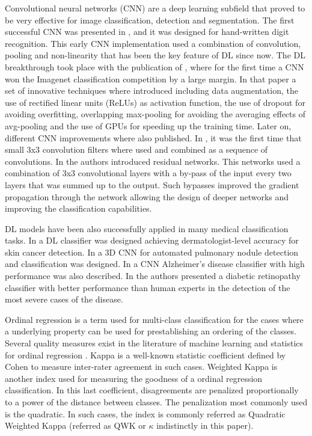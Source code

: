\documentclass[preprint]{elsarticle}
\theoremstyle{definition} %
\theoremstyle{remark}
\begin{document}
Convolutional neural networks (CNN) are a deep learning subfield that proved to be very effective for image classification, detection and segmentation. The first successful CNN was presented in \citep{LeCun:98}, and it was designed for hand-written digit recognition. This early CNN implementation used a combination of convolution, pooling and non-linearity that has been the key feature of DL since now. The DL breakthrough took place with the publication of \citep{NIPS2012_4824}, where for the first time a CNN won the Imagenet\citep{imagenet_cvpr09} classification competition by a large margin. In that paper a set of innovative techniques where introduced including data augmentation, the use of rectified linear units (ReLUs) as activation function, the use of dropout for avoiding overfitting, overlapping max-pooling for avoiding the averaging effects of avg-pooling and the use of GPUs for speeding up the training time. Later on, different CNN improvements where also published. In \citep{vggnet}, it was the first time that small 3x3 convolution filters where used and combined as a sequence of convolutions. In \citep{he2016deep} the authors introduced residual networks. This networks used a combination of 3x3 convolutional layers with a by-pass of the input every two layers that was summed up to the output. Such bypasses improved the gradient propagation through the network allowing the design of deeper networks and improving the classification capabilities. 

DL models have been also successfully applied in many medical classification tasks. In \citep{esteva2017dermatologist} a DL classifier was designed achieving dermatologist-level accuracy for skin cancer detection. In \citep{wentao2018deeplung} a 3D CNN for automated pulmonary nodule detection and classification was designed. In \citep{wang2018classification} a CNN Alzheimer's disease classifier with high performance was also described. In \citep{doi:10.1001/jama.2016.17216} the authors presented a diabetic retinopathy classifier with better performance than human experts in the detection of the most severe cases of the disease.

Ordinal regression is a term used for multi-class classification for the cases where a underlying property can be used for prestablishing an ordering of the classes. Several quality measures exist in the literature of machine learning and statistics for ordinal regression \citep{mehdiyev2016evaluating}. Kappa is a well-known statistic coefficient defined by Cohen \citep{cohen1960coefficient} to measure inter-rater agreement in such cases. Weighted Kappa \citep{cohen1968weighted} is another index used for measuring the goodness of a ordinal regression classification. In this last coefficient, disagreements are penalized proportionally to a power of the distance between classes. The penalization most commonly used is the quadratic. In such cases, the index is commonly referred as Quadratic Weighted Kappa (referred as QWK or $\kappa$ indistinctly in this paper).
\end{document}
